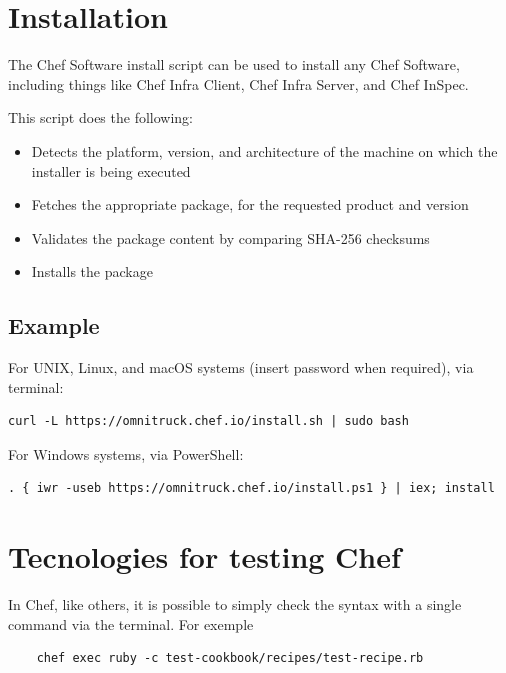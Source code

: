 \documentclass[12pt,a4paper,openright,twoside]{book}
\begin{document}
\section{Installation}
The Chef Software install script can be used to install any Chef Software, including things like Chef Infra Client, Chef Infra Server, and Chef InSpec.


This script does the following:
\begin{itemize}
    \item Detects the platform, version, and architecture of the machine on which the installer is being executed
    \item Fetches the appropriate package, for the requested product and version
    \item Validates the package content by comparing SHA-256 checksums
    \item Installs the package
\end{itemize}


\cite{chefDocInstall}

\subsection{Example}

For UNIX, Linux, and macOS systems (insert password when required), via terminal:


\begin{lstlisting}
curl -L https://omnitruck.chef.io/install.sh | sudo bash
\end{lstlisting}


For Windows systems, via PowerShell:
\begin{lstlisting}
. { iwr -useb https://omnitruck.chef.io/install.ps1 } | iex; install
\end{lstlisting}


\cite{chefDocInstall}

\section{Tecnologies for testing Chef}
In Chef, like others, it is possible to simply check the syntax with a single command via the terminal.
For exemple\cite{chefTestMedium}
\begin{lstlisting}
    chef exec ruby -c test-cookbook/recipes/test-recipe.rb
\end{lstlisting}
\end{document}
